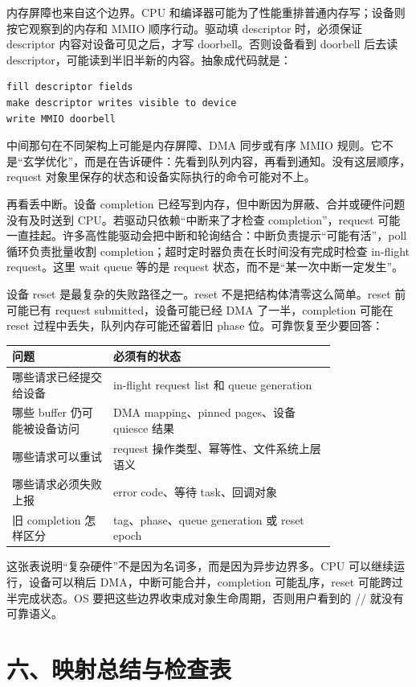 内存屏障也来自这个边界。CPU 和编译器可能为了性能重排普通内存写；设备则按它观察到的内存和 MMIO 顺序行动。驱动填 descriptor 时，必须保证 descriptor 内容对设备可见之后，才写 doorbell。否则设备看到 doorbell 后去读 descriptor，可能读到半旧半新的内容。抽象成代码就是：

\begin{lstlisting}
fill descriptor fields
make descriptor writes visible to device
write MMIO doorbell
\end{lstlisting}

中间那句在不同架构上可能是内存屏障、DMA 同步或有序 MMIO 规则。它不是“玄学优化”，而是在告诉硬件：先看到队列内容，再看到通知。没有这层顺序，request 对象里保存的状态和设备实际执行的命令可能对不上。

再看丢中断。设备 completion 已经写到内存，但中断因为屏蔽、合并或硬件问题没有及时送到 CPU。若驱动只依赖“中断来了才检查 completion”，request 可能一直挂起。许多高性能驱动会把中断和轮询结合：中断负责提示“可能有活”，poll 循环负责批量收割 completion；超时定时器负责在长时间没有完成时检查 in-flight request。这里 wait queue 等的是 request 状态，而不是“某一次中断一定发生”。

设备 reset 是最复杂的失败路径之一。reset 不是把结构体清零这么简单。reset 前可能已有 request submitted，设备可能已经 DMA 了一半，completion 可能在 reset 过程中丢失，队列内存可能还留着旧 phase 位。可靠恢复至少要回答：

\begin{longtable}{p{0.25\linewidth}p{0.55\linewidth}}
\toprule
问题 & 必须有的状态 \\
\midrule
哪些请求已经提交给设备 & in-flight request list 和 queue generation \\
哪些 buffer 仍可能被设备访问 & DMA mapping、pinned pages、设备 quiesce 结果 \\
哪些请求可以重试 & request 操作类型、幂等性、文件系统上层语义 \\
哪些请求必须失败上报 & error code、等待 task、回调对象 \\
旧 completion 怎样区分 & tag、phase、queue generation 或 reset epoch \\
\bottomrule
\end{longtable}

这张表说明“复杂硬件”不是因为名词多，而是因为异步边界多。CPU 可以继续运行，设备可以稍后 DMA，中断可能合并，completion 可能乱序，reset 可能跨过半完成状态。OS 要把这些边界收束成对象生命周期，否则用户看到的 // 就没有可靠语义。

\section{六、映射总结与检查表}

